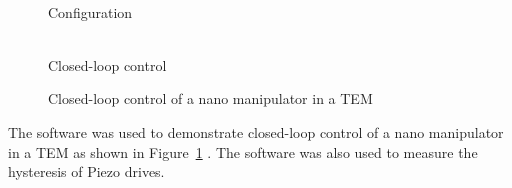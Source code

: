 \documentclass[12pt,a4paper,oneside,openright]{book}
\newcommand{\fig}[1]{Figure~\ref{fig:#1}}
\begin{document}
\begin{CJK}{UTF8}{}
\begin{figure}[htbp]
  \begin{center}
    \begin{minipage}[t]{.47\textwidth}
      \begin{center}
        \\
        Configuration
      \end{center}
    \end{minipage}
    \begin{minipage}[t]{.47\textwidth}
      \begin{center}
        \\
        Closed-loop control
      \end{center}
    \end{minipage}
    \caption{Closed-loop control of a nano manipulator in a \acs{TEM}\label{fig:nanoconf}}
  \end{center}
\end{figure}
The software was used to demonstrate closed-loop control of a nano manipulator in a \ac{TEM} as shown in \fig{nanoconf} \citep{0957-0233-21-7-075901}. The software was also used to measure the hysteresis of Piezo drives.


\end{CJK}
\end{document}
